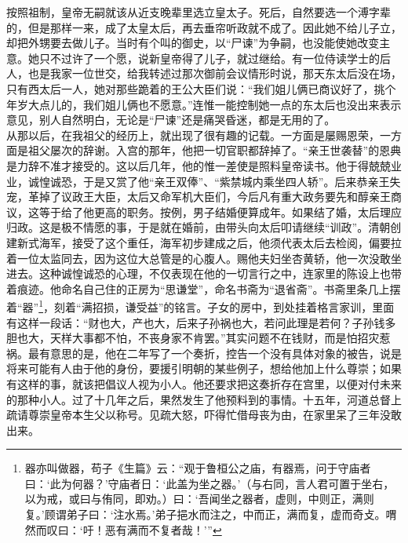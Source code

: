 按照祖制，皇帝无嗣就该从近支晚辈里选立皇太子。死后，自然要选一个溥字辈的，但是那样一来，成了太皇太后，再去垂帘听政就不成了。因此她不给儿子立，却把外甥要去做儿子。当时有个叫的御史，以“尸谏”为争嗣，也没能使她改变主意。她只不过许了一个愿，说新皇帝得了儿子，就过继给。有一位侍读学士的后人，也是我家一位世交，给我转述过那次御前会议情形时说，那天东太后没在场，只有西太后一人，她对那些跪着的王公大臣们说：“我们姐儿俩已商议好了，挑个年岁大点儿的，我们姐儿俩也不愿意。”连惟一能控制她一点的东太后也没出来表示意见，别人自然明白，无论是“尸谏”还是痛哭昏迷，都是无用的了。\\

从那以后，在我祖父的经历上，就出现了很有趣的记载。一方面是屡赐恩荣，一方面是祖父屡次的辞谢。入宫的那年，他把一切官职都辞掉了。“亲王世袭替”的恩典是力辞不准才接受的。这以后几年，他的惟一差使是照料皇帝读书。他于得兢兢业业，诚惶诚恐，于是又赏了他“亲王双俸”、“紫禁城内乘坐四人轿”。后来恭亲王失宠，革掉了议政王大臣，太后又命军机大臣们，今后凡有重大政务要先和醇亲王商议，这等于给了他更高的职务。按例，男子结婚便算成年。如果结了婚，太后理应归政。这是极不情愿的事，于是就在婚前，由带头向太后叩请继续“训政”。清朝创建新式海军，接受了这个重任，海军初步建成之后，他须代表太后去检阅，偏要拉着一位太监同去，因为这位大总管是的心腹人。赐他夫妇坐杏黄轿，他一次没敢坐进去。这种诚惶诚恐的心理，不仅表现在他的一切言行之中，连家里的陈设上也带着痕迹。他命名自己住的正房为“思谦堂”，命名书斋为“退省斋”。书斋里条几上摆着“器”\footnote{器亦叫做器，苟子《生篇》云：“观于鲁桓公之庙，有器焉，问于守庙者曰：‘此为何器？’守庙者日：‘此盖为坐之器。’（与右同，言人君可置于坐右，以为戒，或曰与侑同，即劝。）曰：‘吾闻坐之器者，虚则，中则正，满则复。’顾谓弟子曰：‘注水焉。’弟子挹水而注之，中而正，满而复，虚而奇攴。喟然而叹曰：‘吁！恶有满而不复者哉！’”}，刻着“满招损，谦受益”的铭言。子女的房中，到处挂着格言家训，里面有这样一段话：“财也大，产也大，后来子孙祸也大，若问此理是若何？子孙钱多胆也大，天样大事都不怕，不丧身家不肯罢。”其实问题不在钱财，而是怕招灾惹祸。最有意思的是，他在二年写了一个奏折，控告一个没有具体对象的被告，说是将来可能有人由于他的身份，要援引明朝的某些例子，想给他加上什么尊崇；如果有这样的事，就该把倡议人视为小人。他还要求把这奏折存在宫里，以便对付未来的那种小人。过了十几年之后，果然发生了他预料到的事情。十五年，河道总督上疏请尊崇皇帝本生父以称号。见疏大怒，吓得忙借母丧为由，在家里呆了三年没敢出来。\\

